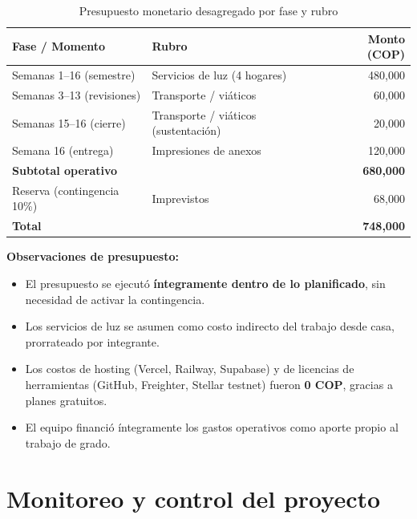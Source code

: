 \documentclass[12pt,oneside]{report}
\begin{document}
      \begin{table}[H]
        \centering
        \begin{tabular}{@{}p{5.0cm} p{5.5cm} r@{}}
          \toprule
          \textbf{Fase / Momento} & \textbf{Rubro} & \textbf{Monto (COP)}\\
          \midrule
          Semanas 1--16 (semestre) & Servicios de luz (4 hogares) & 480{,}000\\
          Semanas 3--13 (revisiones)& Transporte / viáticos & 60{,}000\\
          Semanas 15--16 (cierre) & Transporte / viáticos (sustentación) & 20{,}000\\
          Semana 16 (entrega) & Impresiones de anexos & 120{,}000\\
          \midrule
          \textbf{Subtotal operativo} & & \textbf{680{,}000}\\
          Reserva (contingencia 10\%) & Imprevistos & 68{,}000\\
          \midrule
          \textbf{Total} & & \textbf{748{,}000}\\
          \bottomrule
        \end{tabular}
        \caption{Presupuesto monetario desagregado por fase y rubro}
        \label{tab:presupuesto-fases}
      \end{table}

      \textbf{Observaciones de presupuesto:}
      \begin{itemize}
        \item El presupuesto se ejecutó \textbf{íntegramente dentro de lo planificado}, sin necesidad de activar la contingencia.
        \item Los servicios de luz se asumen como costo indirecto del trabajo desde casa, prorrateado por integrante.
        \item Los costos de hosting (Vercel, Railway, Supabase) y de licencias de herramientas (GitHub, Freighter, Stellar testnet) fueron \textbf{0 COP}, gracias a planes gratuitos.
        \item El equipo financió íntegramente los gastos operativos como aporte propio al trabajo de grado.
      \end{itemize}

  \section{Monitoreo y control del proyecto}
  \label{sec:monitoreo-control}
\end{document}
